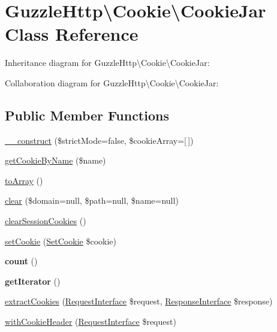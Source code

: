 \hypertarget{classGuzzleHttp_1_1Cookie_1_1CookieJar}{}\section{Guzzle\+Http\textbackslash{}Cookie\textbackslash{}Cookie\+Jar Class Reference}
\label{classGuzzleHttp_1_1Cookie_1_1CookieJar}


Inheritance diagram for Guzzle\+Http\textbackslash{}Cookie\textbackslash{}Cookie\+Jar\+:


Collaboration diagram for Guzzle\+Http\textbackslash{}Cookie\textbackslash{}Cookie\+Jar\+:
\subsection*{Public Member Functions}
\begin{DoxyCompactItemize}
\item 
\hyperlink{classGuzzleHttp_1_1Cookie_1_1CookieJar_a0c8c9443bcb9bfeccaad84763ddc6ba3}{\+\_\+\+\_\+construct} (\$strict\+Mode=false, \$cookie\+Array=\mbox{[}$\,$\mbox{]})
\item 
\hyperlink{classGuzzleHttp_1_1Cookie_1_1CookieJar_a9cf49d547f8764e0b816c90d7b9a733a}{get\+Cookie\+By\+Name} (\$name)
\item 
\hyperlink{classGuzzleHttp_1_1Cookie_1_1CookieJar_aaefc8cd1a587b3ab33166e5b189a6dfd}{to\+Array} ()
\item 
\hyperlink{classGuzzleHttp_1_1Cookie_1_1CookieJar_a022cbce4acc7ea4beb36db01b50cb330}{clear} (\$domain=null, \$path=null, \$name=null)
\item 
\hyperlink{classGuzzleHttp_1_1Cookie_1_1CookieJar_a2d9a31508947248644e43d5f86defdf2}{clear\+Session\+Cookies} ()
\item 
\hyperlink{classGuzzleHttp_1_1Cookie_1_1CookieJar_aad8a1f58451d3b8305793c16923bf511}{set\+Cookie} (\hyperlink{classGuzzleHttp_1_1Cookie_1_1SetCookie}{Set\+Cookie} \$cookie)
\item 
\mbox{\label{classGuzzleHttp_1_1Cookie_1_1CookieJar_aefef499e6badac565cdd83edabd7370c}} 
{\bfseries count} ()
\item 
\mbox{\label{classGuzzleHttp_1_1Cookie_1_1CookieJar_a769061a2cf2b6c32986f108b2a7fd68b}} 
{\bfseries get\+Iterator} ()
\item 
\hyperlink{classGuzzleHttp_1_1Cookie_1_1CookieJar_a430389ccb62792ad900095f6010ee483}{extract\+Cookies} (\hyperlink{interfacePsr_1_1Http_1_1Message_1_1RequestInterface}{Request\+Interface} \$request, \hyperlink{interfacePsr_1_1Http_1_1Message_1_1ResponseInterface}{Response\+Interface} \$response)
\item 
\hyperlink{classGuzzleHttp_1_1Cookie_1_1CookieJar_acca0464fa0926e364848fe9c81f96714}{with\+Cookie\+Header} (\hyperlink{interfacePsr_1_1Http_1_1Message_1_1RequestInterface}{Request\+Interface} \$request)
\end{DoxyCompactItemize}
